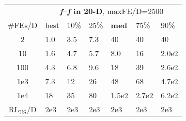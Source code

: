 \begin{tabular}{c|llllll}
 & \multicolumn{6}{|c}{\textbf{\textit{f}\raisebox{-0.35ex}{1}--\textit{f}\raisebox{-0.35ex}{24} in 20-D}, maxFE/D=2500}\\
\#FEs/D & best & 10\% & 25\% & \textbf{med} & 75\% & 90\%\\
2 & \hspace*{1ex}1.0 & \hspace*{1ex}3.5 & \hspace*{1ex}7.3 & 40 & 40 & 40\\
10 & \hspace*{1ex}1.6 & \hspace*{1ex}4.7 & \hspace*{1ex}5.7 & \hspace*{1ex}8.0 & 16 & 2.0e2\\
100 & \hspace*{1ex}4.3 & \hspace*{1ex}6.8 & \hspace*{1ex}9.6 & 18 & 39 & 2.6e2\\
1e3 & \hspace*{1ex}7.3 & 12 & 26 & 48 & 68 & 4.7e2\\
1e4 & 18 & 35 & 80 & 1.5e2 & 2.7e2 & 6.2e2\\
$\text{RL}_{\text{US}}$/D & 2e3 & 2e3 & 2e3 & 2e3 & 2e3 & 2e3
\end{tabular}

